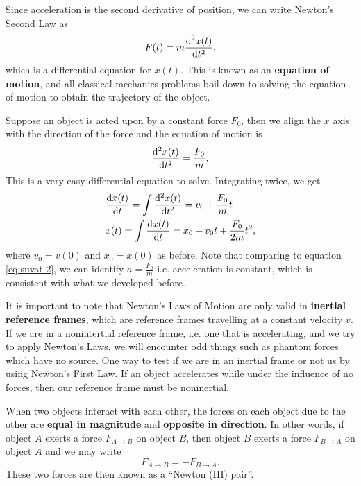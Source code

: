 \documentclass[../classical_mechanics.tex]{subfiles}
\begin{document}
        Since acceleration is the second derivative of position, we can write Newton's Second Law as
        \begin{equation}
            F(t)=m\dv[2]{x(t)}{t},
        \end{equation}
        which is a differential equation for $x(t)$.
        This is known as an \textbf{equation of motion}, and all classical mechanics problems boil down to solving the equation of motion to obtain the trajectory of the object.
        \begin{example}
            Suppose an object is acted upon by a constant force $F_0$, then we align the $x$ axis with the direction of the force and the equation of motion is
            \begin{equation}
                \dv[2]{x(t)}{t}=\frac{F_0}{m}.
            \end{equation}
            This is a very easy differential equation to solve.
            Integrating twice, we get
            \begin{align}
                &\dv{x(t)}{t}=\int\dv[2]{x(t)}{t}=v_0+\frac{F_0}{m}t\\
                &x(t)=\int\dv{x(t)}{t}=x_0+v_0t+\frac{F_0}{2m}t^2,
            \end{align}
            where $v_0=v(0)$ and $x_0=x(0)$ as before.
            Note that comparing to equation \ref{eq:suvat-2}, we can identify $a=\frac{F_0}{m}$ i.e. acceleration is constant, which is consistent with what we developed before.
        \end{example}
        It is important to note that Newton's Laws of Motion are only valid in \textbf{inertial reference frames}, which are reference frames travelling at a constant velocity $v$.
        If we are in a nonintertial reference frame, i.e. one that is accelerating, and we try to apply Newton's Laws, we will encounter odd things such as phantom forces which have no source.
        One way to test if we are in an inertial frame or not us by using Newton's First Law.
        If an object accelerates while under the influence of no forces, then our reference frame must be noninertial.
        \begin{definition}\label{def:newton-3}
            When two objects interact with each other, the forces on each object due to the other are \textbf{equal in magnitude} and \textbf{opposite in direction}.
            In other words, if object $A$ exerts a force $F_{A\to B}$ on object $B$, then object $B$ exerts a force $F_{B\to A}$ on object $A$ and we may write
            \begin{equation}
                F_{A\to B}=-F_{B\to A}.
            \end{equation}
            These two forces are then known as a ``Newton (III) pair''.
        \end{definition}
\end{document}
